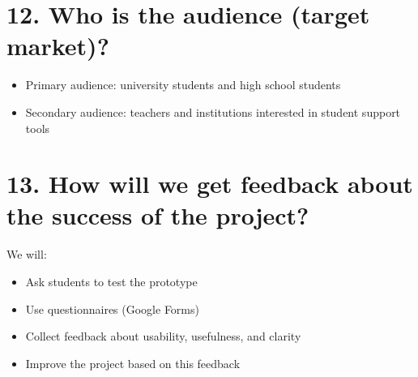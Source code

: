 \documentclass[11pt,a4paper]{article}
\begin{document}
\section*{12. Who is the audience (target market)?}
\begin{itemize}
  \item Primary audience: university students and high school students
  \item Secondary audience: teachers and institutions interested in student support tools
\end{itemize}

\section*{13. How will we get feedback about the success of the project?}
We will:
\begin{itemize}
  \item Ask students to test the prototype
  \item Use questionnaires (Google Forms)
  \item Collect feedback about usability, usefulness, and clarity
  \item Improve the project based on this feedback
\end{itemize}
\end{document}
